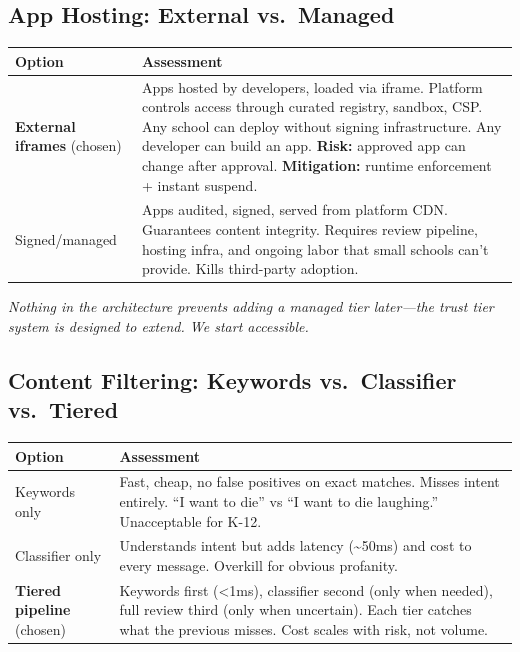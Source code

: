 \documentclass[11pt,letterpaper]{article}
\begin{document}
\subsection*{App Hosting: External vs.\ Managed}

\begin{tabularx}{\textwidth}{l X}
\toprule
\textbf{Option} & \textbf{Assessment} \\
\midrule
\textbf{External iframes} {\color{cbgreen}(chosen)} & Apps hosted by developers, loaded via iframe. Platform controls access through curated registry, sandbox, CSP. Any school can deploy without signing infrastructure. Any developer can build an app. \textbf{Risk:} approved app can change after approval. \textbf{Mitigation:} runtime enforcement + instant suspend. \\
Signed/managed & Apps audited, signed, served from platform CDN. Guarantees content integrity. Requires review pipeline, hosting infra, and ongoing labor that small schools can't provide. Kills third-party adoption. \\
\bottomrule
\end{tabularx}

\noindent\textit{Nothing in the architecture prevents adding a managed tier later---the trust tier system is designed to extend. We start accessible.}

\subsection*{Content Filtering: Keywords vs.\ Classifier vs.\ Tiered}

\begin{tabularx}{\textwidth}{l X}
\toprule
\textbf{Option} & \textbf{Assessment} \\
\midrule
Keywords only & Fast, cheap, no false positives on exact matches. Misses intent entirely. ``I want to die'' vs ``I want to die laughing.'' Unacceptable for K-12. \\
Classifier only & Understands intent but adds latency (\textasciitilde50ms) and cost to every message. Overkill for obvious profanity. \\
\textbf{Tiered pipeline} {\color{cbgreen}(chosen)} & Keywords first (<1ms), classifier second (only when needed), full review third (only when uncertain). Each tier catches what the previous misses. Cost scales with risk, not volume. \\
\bottomrule
\end{tabularx}
\end{document}

